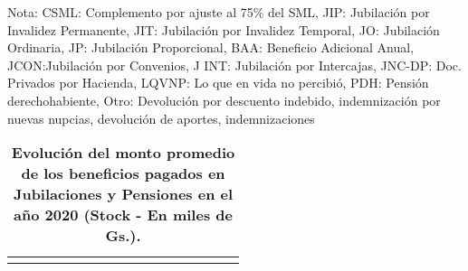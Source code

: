Nota: CSML: Complemento por ajuste al 75\% del SML, JIP: Jubilación por
Invalidez Permanente, JIT: Jubilación por Invalidez Temporal, JO:
Jubilación Ordinaria, JP: Jubilación Proporcional, BAA: Beneficio
Adicional Anual, JCON:Jubilación por Convenios, J INT: Jubilación por
Intercajas, JNC-DP: Doc. Privados por Hacienda, LQVNP: Lo que en vida no
percibió, PDH: Pensión derechohabiente, Otro: Devolución por descuento
indebido, indemnización por nuevas nupcias, devolución de aportes,
indemnizaciones

\begin{table}[H]
\begin{center}
\caption{\bf{Evolución del monto promedio de los beneficios pagados en Jubilaciones y Pensiones en el año 2020 (Stock - En miles de Gs.).}}
\begin{tabular}{l|rrrrrrrrrrrrrrr}
\scriptsize
%
\end{tabular}
\end{center}
\end{table}
